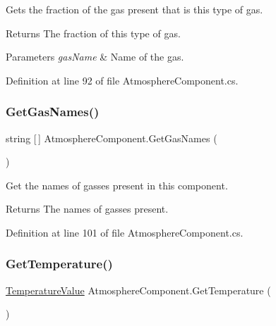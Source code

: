 Gets the fraction of the gas present that is this type of gas. 

\begin{DoxyReturn}{Returns}
The fraction of this type of gas.
\end{DoxyReturn}

\begin{DoxyParams}{Parameters}
{\em gas\+Name} & Name of the gas.\\
\hline
\end{DoxyParams}


Definition at line 92 of file Atmosphere\+Component.\+cs.

\mbox{\label{class_atmosphere_component_a6a41cdeb590b5c1b4fe5336fc62039ab}} 
\subsubsection{\texorpdfstring{Get\+Gas\+Names()}{GetGasNames()}}
{\footnotesize\ttfamily string \mbox{[}$\,$\mbox{]} Atmosphere\+Component.\+Get\+Gas\+Names (\begin{DoxyParamCaption}{ }\end{DoxyParamCaption})}



Get the names of gasses present in this component. 

\begin{DoxyReturn}{Returns}
The names of gasses present.
\end{DoxyReturn}


Definition at line 101 of file Atmosphere\+Component.\+cs.

\mbox{\label{class_atmosphere_component_a46943e800a2c308b26728a7cbc4b8f71}} 
\subsubsection{\texorpdfstring{Get\+Temperature()}{GetTemperature()}}
{\footnotesize\ttfamily \hyperlink{struct_temperature_value}{Temperature\+Value} Atmosphere\+Component.\+Get\+Temperature (\begin{DoxyParamCaption}{ }\end{DoxyParamCaption})}



